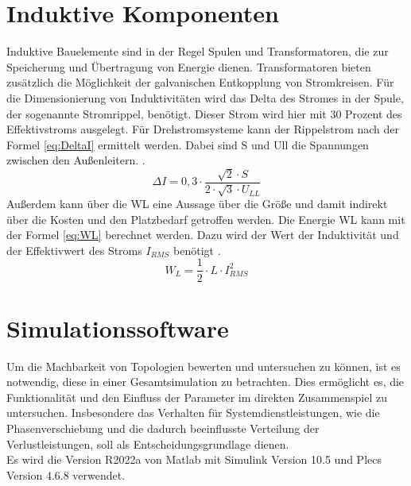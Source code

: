 \section{Induktive Komponenten}
	Induktive Bauelemente sind in der Regel Spulen und Transformatoren, die zur Speicherung und Übertragung von Energie dienen. Transformatoren bieten zusätzlich die Möglichkeit der galvanischen Entkopplung von Stromkreisen. 
	Für die Dimensionierung von Induktivitäten wird das Delta des Stromes in der Spule, der sogenannte Stromrippel, benötigt. Dieser Strom wird hier mit 30 Prozent des Effektivstroms ausgelegt. Für Drehstromsysteme kann der Rippelstrom nach der Formel \ref{eq:DeltaI} ermittelt werden. Dabei sind \gls{S} und \gls{Ull} die Spannungen zwischen den Außenleitern. \cite{Boge.2007}.\\
	\begin{equation}
		\label{eq:DeltaI}
		 \Delta I = 0,3 \cdot \dfrac{\sqrt{2} \cdot S}{2 \cdot \sqrt{3} \cdot U_{LL}}
	\end{equation}
	Außerdem kann über die \gls{WL} eine Aussage über die Größe und damit indirekt über die Kosten und den Platzbedarf getroffen werden. Die Energie \gls{WL} kann mit der Formel \ref{eq:WL} berechnet werden. Dazu wird der Wert der Induktivität und der Effektivwert des Stroms $I_{RMS}$ benötigt \cite{Boge.2007}.
	\begin{equation}
		\label{eq:WL}
		W_{L} =\dfrac{1}{2}\cdot L\cdot I_{RMS}^{2}
	\end{equation}
	



\section{Simulationssoftware}
	Um die Machbarkeit von Topologien bewerten und untersuchen zu können, ist es notwendig, diese in einer Gesamtsimulation zu betrachten. Dies ermöglicht es, die Funktionalität und den Einfluss der Parameter im direkten Zusammenspiel zu untersuchen. Insbesondere das Verhalten für Systemdienstleistungen, wie die Phasenverschiebung und die dadurch beeinflusste Verteilung der Verlustleistungen, soll als Entscheidungsgrundlage dienen.\\
	Es wird die Version R2022a von Matlab mit Simulink Version 10.5 und Plecs Version 4.6.8 verwendet.  

